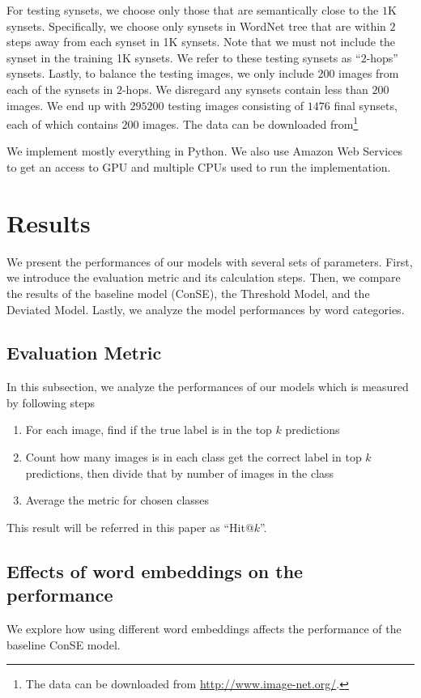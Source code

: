 \documentclass[11pt,letterpaper]{article}
\begin{document}
For testing synsets, we choose only those that are semantically close to the $1$K synsets. Specifically, we choose only synsets in WordNet tree that are within $2$ steps away from each synset in 1K synsets. Note that we must not include the synset in the training 1K synsets. We refer to these testing synsets as ``$2$-hops'' synsets. Lastly, to balance the testing images, we only include $200$ images from each of the synsets in $2$-hops. We disregard any synsets contain less than $200$ images. We end up with $295200$ testing images consisting of $1476$ final synsets, each of which contains $200$ images. The data can be downloaded from\footnote{The data can be downloaded from \url{http://www.image-net.org/}.}

We implement mostly everything in Python. We also use Amazon Web Services to get an access to GPU and multiple CPUs used to run the implementation.


\section{Results}

We present the performances of our models with several sets of parameters. First, we introduce the evaluation metric and its calculation steps. Then, we compare the results of the baseline model (ConSE), the Threshold Model, and the Deviated Model. Lastly, we analyze the model performances by word categories.

\subsection{Evaluation Metric}
In this subsection, we analyze the performances of our models which is measured by following steps
\begin{enumerate}
\item For each image, find if the true label is in the top $k$ predictions
\item Count how many images is in each class get the correct label in top $k$ predictions, then divide that by number of images in the class
\item Average the metric for chosen classes
\end{enumerate}
This result will be referred in this paper as ``Hit@$k$''.

\subsection{Effects of word embeddings on the performance}
We explore how using different word embeddings affects the performance of the baseline ConSE model. 
\end{document}
